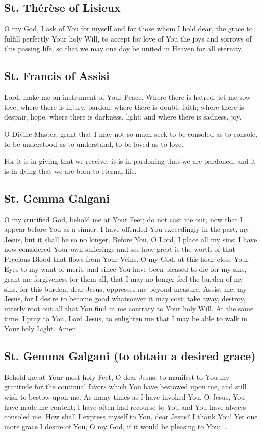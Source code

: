 \documentclass[12pt]{article}
\newcommand{\prayertitle}[1]{\subsection{#1}}
\begin{document}
\prayertitle{St. Th\'{e}r\`{e}se of Lisieux}
O my God, I ask of You for myself and for those whom I hold dear, the grace to fulfill perfectly Your holy Will, to accept for love of You the joys and sorrows of this passing life, so that we may one day be united in Heaven for all eternity.

\prayertitle{St. Francis of Assisi}
Lord, make me an instrument of Your Peace.
Where there is hatred, let me sow love;
where there is injury, pardon;
where there is doubt, faith;
where there is despair, hope;
where there is darkness, light;
and where there is sadness, joy.

O Divine Master, grant that I may not so much seek to be consoled as to console, to be understood as to understand, to be loved as to love.

For it is in giving that we receive, it is in pardoning that we are pardoned, and it is in dying that we are born to eternal life.

\prayertitle{St. Gemma Galgani}
O my crucified God, behold me at Your Feet;
do not cast me out, now that I appear before You as a sinner.
I have offended You exceedingly in the past, my Jesus, but it shall be so no longer.
Before You, O Lord, I place all my sins;
I have now considered Your own sufferings and see how great is the worth of that Precious Blood that flows from Your Veins.
O my God, at this hour close Your Eyes to my want of merit, and since You have been pleased to die for my sins, grant me forgiveness for them all, that I may no longer feel the burden of my sins, for this burden, dear Jesus, oppresses me beyond measure.
Assist me, my Jesus, for I desire to become good whatsoever it may cost;
take away, destroy, utterly root out all that You find in me contrary to Your holy Will.
At the same time, I pray to You, Lord Jesus, to enlighten me that I may be able to walk in Your holy Light.
Amen.

\prayertitle{St. Gemma Galgani (to obtain a desired grace)}
Behold me at Your most holy Feet, O dear Jesus, to manifest to You my gratitude for the continual favors which You have bestowed upon me, and still wish to bestow upon me.
As many times as I have invoked You, O Jesus, You have made me content;
I have often had recourse to You and You have always consoled me.
How shall I express myself to You, dear Jesus?
I thank You!
Yet one more grace I desire of You, O my God, if it would be pleasing to You: \ldots
\end{document}
